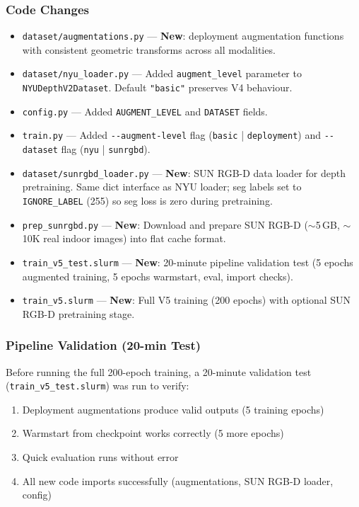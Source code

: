 \documentclass[11pt,a4paper]{article}
\begin{document}
\subsubsection{Code Changes}

\begin{itemize}[nosep]
  \item \texttt{dataset/augmentations.py} --- \textbf{New}: deployment augmentation
    functions with consistent geometric transforms across all modalities.
  \item \texttt{dataset/nyu\_loader.py} --- Added \texttt{augment\_level} parameter
    to \texttt{NYUDepthV2Dataset}. Default \texttt{"basic"} preserves V4 behaviour.
  \item \texttt{config.py} --- Added \texttt{AUGMENT\_LEVEL} and \texttt{DATASET}
    fields.
  \item \texttt{train.py} --- Added \texttt{-{}-augment-level} flag
    (\texttt{basic} | \texttt{deployment}) and \texttt{-{}-dataset} flag
    (\texttt{nyu} | \texttt{sunrgbd}).
  \item \texttt{dataset/sunrgbd\_loader.py} --- \textbf{New}: SUN RGB-D data loader
    for depth pretraining. Same dict interface as NYU loader; seg labels set to
    \texttt{IGNORE\_LABEL} (255) so seg loss is zero during pretraining.
  \item \texttt{prep\_sunrgbd.py} --- \textbf{New}: Download and prepare SUN RGB-D
    ($\sim$5\,GB, $\sim$10K real indoor images) into flat cache format.
  \item \texttt{train\_v5\_test.slurm} --- \textbf{New}: 20-minute pipeline validation
    test (5 epochs augmented training, 5 epochs warmstart, eval, import checks).
  \item \texttt{train\_v5.slurm} --- \textbf{New}: Full V5 training (200 epochs)
    with optional SUN RGB-D pretraining stage.
\end{itemize}

\subsubsection{Pipeline Validation (20-min Test)}

Before running the full 200-epoch training, a 20-minute validation test
(\texttt{train\_v5\_test.slurm}) was run to verify:

\begin{enumerate}[nosep]
  \item Deployment augmentations produce valid outputs (5 training epochs)
  \item Warmstart from checkpoint works correctly (5 more epochs)
  \item Quick evaluation runs without error
  \item All new code imports successfully (augmentations, SUN RGB-D loader, config)
\end{enumerate}
\end{document}
